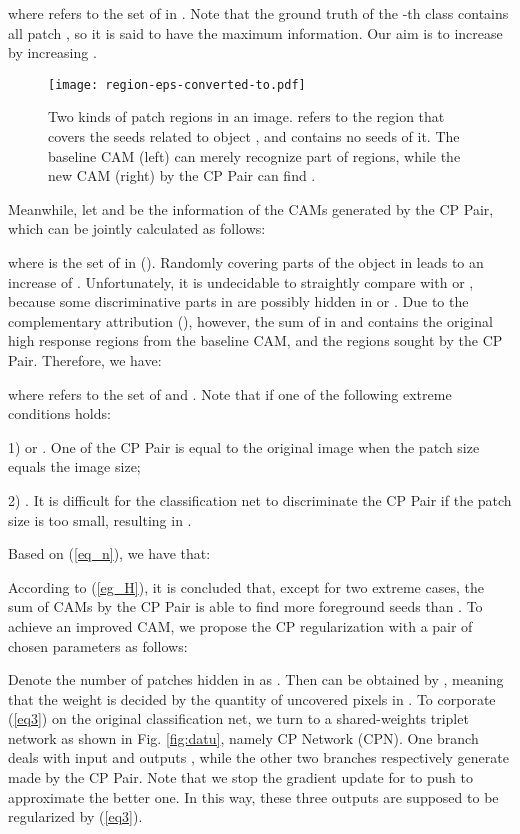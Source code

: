 \documentclass[10pt,twocolumn,letterpaper]{article}
\begin{document}
where  refers to the set of  in . Note that the ground truth of the -th class contains all patch , so it is said to have the maximum information. Our aim is to increase  by increasing .
\begin{figure}
\begin{center}
\texttt{[image: region-eps-converted-to.pdf]}
\end{center}
\vspace{-4mm}
   \caption{Two kinds of patch regions in an image.  refers to the region that covers the seeds related to object , and  contains no seeds of it. The baseline CAM (left) can merely recognize part of  regions, while the new CAM (right) by the CP Pair can find .}
\label{fig:region}
\end{figure}


Meanwhile, let  and  be the information of the CAMs generated by the CP Pair, which can be jointly calculated as follows:

where  is the set of  in  (). Randomly covering parts of the object  in  leads to an increase of . Unfortunately, it is undecidable to straightly compare  with  or , because some discriminative parts in  are possibly hidden in  or . Due to the complementary attribution (), however, the sum of  in  and  contains the original high response regions from the baseline CAM, and the  regions sought by the CP Pair. Therefore, we have:
 
where  refers to the set of  and . Note that  if one of the following extreme conditions holds:

1)  or . One of the CP Pair is equal to the original image when the patch size equals the image size;

2) . It is difficult for the classification net to discriminate the CP Pair if the patch size is too small, resulting in .

Based on (\ref{eq_n}), we have that:



According to (\ref{eg_H}), it is concluded that, except for two extreme cases, the sum of CAMs by the CP Pair is able to find more foreground seeds than . To achieve an improved CAM, we propose the CP regularization with a pair of chosen parameters  as follows:


Denote the number of patches hidden in  as . Then  can be obtained by , meaning that the weight is decided by the quantity of uncovered pixels in .
To corporate (\ref{eq3}) on the original classification net, we turn to a shared-weights triplet network as shown in Fig. \ref{fig:datu}, namely CP Network (CPN). One branch deals with input  and outputs , while the other two branches respectively generate  made by the CP Pair. Note that we stop the gradient update for  to push  to approximate the better one. In this way, these three outputs are supposed to be regularized by (\ref{eq3}).
\end{document}
